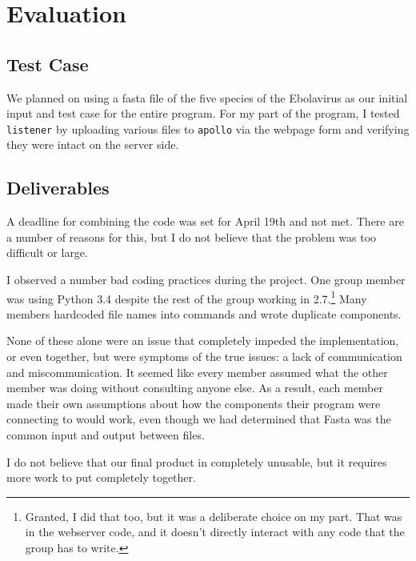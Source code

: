 \documentclass[10pt,letterpaper]{article}
\begin{document}
\section{Evaluation}

\subsection{Test Case}
We planned on using a fasta file of the five species of the Ebolavirus as our initial input and test case for the entire program.
For my part of the program, I tested \texttt{listener} by uploading various files to \texttt{apollo} via the webpage form and verifying they were intact on the server side.


\subsection{Deliverables}
A deadline for combining the code was set for April 19th and not met.
There are a number of reasons for this, but I do not believe that the problem was too difficult or large.

I observed a number bad coding practices during the project.
One group member was using Python 3.4 despite the rest of the group working in 2.7.\footnote{Granted, I did that too, but it was a deliberate choice on my part.  That was in the webserver code, and it doesn't directly interact with any code that the group has to write.}
Many members hardcoded file names into commands and wrote duplicate components.


None of these alone were an issue that completely impeded the implementation, or even together, but were symptoms of the true issues:   a lack of communication and miscommunication.
It seemed like every member assumed what the other member was doing without consulting anyone else.
As a result, each member made their own assumptions about how the components their program were connecting to would work, even though we had determined that Fasta was the common input and output between files.


I do not believe that our final product in completely unusable, but it requires more work to put completely together.



\end{document}
